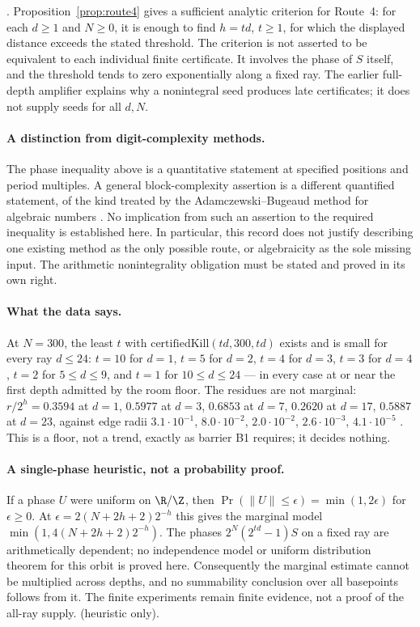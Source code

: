 \noindent
{}. Proposition~\ref{prop:route4} gives a sufficient analytic
criterion for Route~4: for each $d\ge1$ and $N\ge0$, it is enough to find
$h=td$, $t\ge1$, for which the displayed distance exceeds the stated
threshold. The criterion is not asserted to be equivalent to each individual
finite certificate. It involves the phase of $S$ itself, and the threshold
tends to zero exponentially along a fixed ray. The earlier full-depth
amplifier explains why a nonintegral seed produces late certificates; it
does not supply seeds for all $d,N$.

\paragraph{A distinction from digit-complexity methods.}
The phase inequality above is a quantitative statement at specified
positions and period multiples. A general block-complexity assertion is a
different quantified statement, of the kind treated by the
Adamczewski--Bugeaud method for algebraic numbers
\cite[Theorem~1, p.~549]{adamczewski-bugeaud}. No implication from such an
assertion to the required inequality is established here. In particular, this record
does not justify describing one existing method as the only possible route,
or algebraicity as the sole missing input. The arithmetic nonintegrality
obligation must be stated and proved in its own right.

\paragraph{What the data says.}
At $N=300$, the least $t$ with $\mathrm{certifiedKill}(td,300,td)$ exists
and is small for every ray $d\le 24$: $t=10$ for $d=1$, $t=5$ for $d=2$,
$t=4$ for $d=3$, $t=3$ for $d=4$, $t=2$ for $5\le d\le 9$, and $t=1$ for
$10\le d\le 24$ --- in every case at or near the first depth admitted by the
room floor. The residues are not marginal: $r/2^{h}=0.3594$ at $d=1$,
$0.5977$ at $d=3$, $0.6853$ at $d=7$, $0.2620$ at $d=17$, $0.5887$ at
$d=23$, against edge radii $3.1\cdot10^{-1}$, $8.0\cdot10^{-2}$,
$2.0\cdot10^{-2}$, $2.6\cdot10^{-3}$, $4.1\cdot10^{-5}$ . This is a
floor, not a trend, exactly as barrier B1 requires; it decides nothing.

\paragraph{A single-phase heuristic, not a probability proof.}
If a phase $U$ were uniform on $\R/\Z$, then
$\Pr(\|U\|\le\epsilon)=\min(1,2\epsilon)$ for $\epsilon\ge0$.
At $\epsilon=2(N+2h+2)2^{-h}$ this gives the marginal model
$\min(1,4(N+2h+2)2^{-h})$. The phases
$2^N(2^{td}-1)S$ on a fixed ray are arithmetically dependent; no independence
model or uniform distribution theorem for this orbit is proved here.
Consequently the marginal estimate cannot be multiplied across depths, and
no summability conclusion over all basepoints follows from it. The finite
experiments remain finite evidence, not a proof of the all-ray supply.
 (heuristic only).

